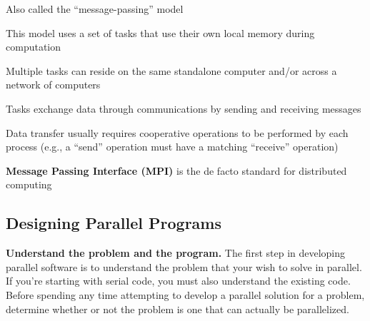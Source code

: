 \documentclass[12pt]{article}
\begin{document}
\begin{compactitem}
\item Also called the ``message-passing'' model
\item This model uses a set of tasks that use their own local memory during
      computation
\item Multiple tasks can reside on the same standalone computer and/or across a
      network of computers
\item Tasks exchange data through communications by sending and receiving
      messages
\item Data transfer usually requires cooperative operations to be performed by
      each process (e.g., a ``send'' operation must have a matching ``receive''
      operation)
\item \textbf{Message Passing Interface (MPI)} is the de facto standard for
      distributed computing
\end{compactitem}

\pagebreak
\subsection*{Designing Parallel Programs}

\textbf{Understand the problem and the program.} The first step in developing
parallel software is to understand the problem that your wish to solve in
parallel. If you're starting with serial code, you must also understand the
existing code. Before spending any time attempting to develop a parallel
solution for a problem, determine whether or not the problem is one that can
actually be parallelized.
\end{document}

